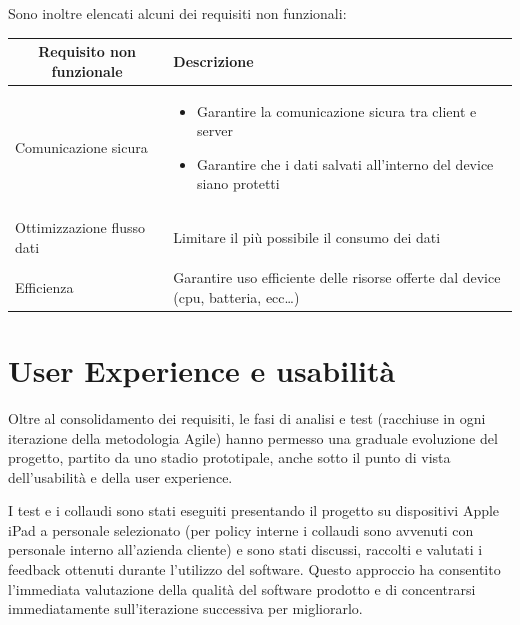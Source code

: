 \newpage

Sono inoltre elencati alcuni dei requisiti non funzionali:

\begin{center}
    

    \begin{tabular}{p{6cm}|p{8cm}}

    \toprule
    \multicolumn{1}{c}{\textbf{Requisito non funzionale}} &
    \textbf{Descrizione}\\

    \midrule
    Comunicazione sicura & \begin{itemize}
                            \item Garantire la comunicazione sicura tra client e server
                            \item Garantire che i dati salvati all'interno del device siano protetti
                           \end{itemize}\\\\
    Ottimizzazione flusso dati & Limitare il più possibile il consumo dei dati\\\\
    Efficienza & Garantire uso efficiente delle risorse offerte dal device (cpu, batteria, ecc\dots)\\

    \bottomrule

    \end{tabular}

\end{center}

\section{User Experience e usabilità}

Oltre al consolidamento dei requisiti, le fasi di analisi e test (racchiuse in ogni iterazione della metodologia Agile) hanno permesso una graduale evoluzione del progetto, partito da uno stadio prototipale, anche sotto il punto di vista dell'usabilità e della user experience.

I test e i collaudi sono stati eseguiti presentando il progetto su dispositivi Apple iPad a personale selezionato (per policy interne i collaudi sono avvenuti con personale interno all'azienda cliente) e sono stati discussi, raccolti e valutati i feedback ottenuti durante l'utilizzo del software.
Questo approccio ha consentito l'immediata valutazione della qualità del software prodotto e di concentrarsi immediatamente sull'iterazione successiva per migliorarlo.

